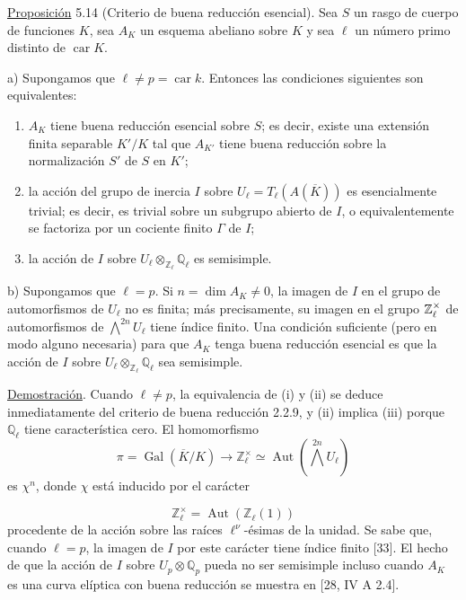 \medskip
\noindent
\underline{Proposición} 5.14 (Criterio de buena reducción esencial).
Sea $S$ un rasgo de cuerpo de funciones $K$, sea $A_K$ un esquema
abeliano sobre $K$ y sea $\ell$ un número primo distinto de
$\operatorname{car}K$.

\smallskip
\noindent
a) Supongamos que $\ell\neq p=\operatorname{car}k$. Entonces las
condiciones siguientes son equivalentes:
\begin{enumerate}
\item[(i)] $A_K$ tiene buena reducción esencial sobre $S$; es decir,
  existe una extensión finita separable $K'/K$ tal que $A_{K'}$ tiene
  buena reducción sobre la normalización $S'$ de $S$ en $K'$;
\item[(ii)] la acción del grupo de inercia $I$ sobre
  $U_\ell=T_\ell(A(\overline K))$ es esencialmente trivial; es decir,
  es trivial sobre un subgrupo abierto de $I$, o equivalentemente se
  factoriza por un cociente finito $\Gamma$ de $I$;
\item[(iii)] la acción de $I$ sobre
  $U_\ell\otimes_{\mathbb Z_\ell}\mathbb Q_\ell$ es semisimple.
\end{enumerate}

\noindent
b) Supongamos que $\ell=p$. Si $n=\dim A_K\neq0$, la imagen de $I$ en
el grupo de automorfismos de $U_\ell$ no es finita; más precisamente,
su imagen en el grupo $\sisi{\mathbb Z_\ell}{\mathbb Z_\ell^\times}$
de automorfismos de $\bigwedge^{2n}U_\ell$ tiene índice finito. Una
condición suficiente (pero en modo alguno necesaria) para que $A_K$
tenga buena reducción esencial es que la acción de $I$ sobre
$U_\ell\otimes_{\mathbb Z_\ell}\mathbb Q_\ell$ sea semisimple.

\noindent
\underline{Demostración}. Cuando $\ell\neq p$, la equivalencia de (i)
y (ii) se deduce inmediatamente del criterio de buena reducción 2.2.9,
y (ii) implica (iii) porque $\mathbb Q_\ell$ tiene característica cero.
El homomorfismo
\[
 \pi=\operatorname{Gal}(\overline K/K)
 \longrightarrow \mathbb Z_\ell^\times
 \simeq\operatorname{Aut}\!\left(\bigwedge^{2n}U_\ell\right)
\]
es $\chi^n$, donde $\chi$ está inducido por el carácter


\[
 \mathbb Z_\ell^\times=\operatorname{Aut}(\mathbb Z_\ell(1))
\]
procedente de la acción sobre las raíces $\ell^\nu$-ésimas de la
unidad. Se sabe que, cuando $\ell=p$, la imagen de $I$ por este carácter
tiene índice finito [33]. El hecho de que la acción de $I$ sobre
$U_p\otimes\mathbb Q_p$ pueda no ser semisimple incluso cuando $A_K$
es una curva elíptica con buena reducción se muestra en [28, IV A 2.4].

